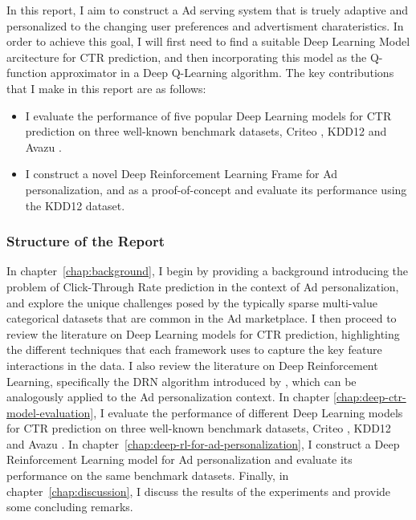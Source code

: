 \documentclass{mldsmsc}
\begin{document}
In this report, I aim to construct a Ad serving system that is truely adaptive and 
personalized to the changing user preferences and advertisment charateristics. In order
to achieve this goal, I will first need to find a suitable Deep Learning Model arcitecture
for CTR prediction, and then incorporating this model as the Q-function approximator in
a Deep Q-Learning algorithm. The key contributions that I make in this report are as follows:

\begin{itemize}
\item I evaluate the performance of five popular Deep Learning models for CTR prediction on three well-known benchmark datasets, Criteo \citep{RefWorks:tien2014display}, KDD12 \citep{RefWorks:aden2012kdd} and Avazu \citep{RefWorks:wang2014click-through}.
\item I construct a novel Deep Reinforcement Learning Frame for Ad personalization, and as a proof-of-concept and evaluate its performance using the KDD12 dataset.
\end {itemize}

\subsubsection{Structure of the Report}

In chapter~\ref{chap:background}, I begin by providing a background introducing the problem
of Click-Through Rate prediction in the context of Ad personalization, and explore the unique challenges posed 
by the typically sparse multi-value categorical datasets that are common in the Ad marketplace. I then 
proceed to review the literature on Deep Learning models for CTR prediction, highlighting
the different techniques that each framework uses to capture the key feature interactions in the data. 
I also review the literature on Deep Reinforcement
Learning, specifically the DRN algorithm introduced by \cite{RefWorks:zheng2018drn:}, which can be analogously
applied to the Ad personalization context. In chapter \ref{chap:deep-ctr-model-evaluation}, I evaluate the performance of different
Deep Learning models for CTR prediction on three well-known benchmark datasets, Criteo \citep{RefWorks:tien2014display}, KDD12 \citep{RefWorks:aden2012kdd} 
and Avazu \citep{RefWorks:wang2014click-through}. In chapter~\ref{chap:deep-rl-for-ad-personalization}, I construct a Deep Reinforcement Learning model for Ad personalization and evaluate its performance
on the same benchmark datasets. Finally, in chapter~\ref{chap:discussion}, I discuss the results of the experiments and provide some concluding remarks.
\end{document}
